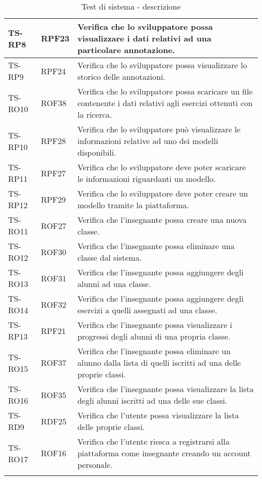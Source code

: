 \begin{longtable}{|>{\centering\arraybackslash}m{1.6cm}|>{\centering\arraybackslash}m{1.7cm}|m{6.41cm}|}
		\\ \hline 
		\rowcolor{white}
		TS-RP8		
		& RPF23 
		& Verifica che lo sviluppatore possa visualizzare i dati relativi ad una particolare annotazione. 		
		\\ \hline
		\rowcolor{LightGray}
		TS-RP9		
		& RPF24 
		& Verifica che lo sviluppatore possa visualizzare lo storico delle annotazioni. 
		\\ \hline
		\rowcolor{white}
		TS-RO10
		& ROF38 
		& Verifica che lo sviluppatore possa scaricare un file contenente i dati relativi agli esercizi ottenuti con la ricerca.
		\\ \hline
		\rowcolor{LightGray}
		TS-RP10		
		& RPF28 
		& Verifica che lo sviluppatore può visualizzare le informazioni relative ad uno dei modelli disponibili. 
		\\ \hline
		\rowcolor{white}
		TS-RP11		
		& RPF27 
		& Verifica che lo sviluppatore deve poter scaricare le informazioni riguardanti un modello. 
		\\ \hline
		\rowcolor{LightGray}
		TS-RP12		
		& RPF29 
		& Verifica che lo sviluppatore deve poter creare un modello tramite la piattaforma. 
		\\ \hline	
		
		\rowcolor{white}
		TS-RO11	
		& ROF27 
		& Verifica che l'insegnante possa creare una nuova classe. 
		\\ \hline
		\rowcolor{LightGray}
		TS-RO12	
		& ROF30 
		& Verifica che l'insegnante possa eliminare una classe dal sistema. 
		\\ \hline
		\rowcolor{white}
		TS-RO13
		& ROF31 
		& Verifica che l'insegnante possa aggiungere degli alunni ad una classe. 
		\\ \hline
		\rowcolor{LightGray}
		TS-RO14
		& ROF32 
		& Verifica che l'insegnante possa aggiungere degli esercizi a quelli assegnati ad una classe. 
		\\ \hline
		\rowcolor{white}
		TS-RP13
		& RPF21 
		& Verifica che l'insegnante possa visualizzare i progressi degli alunni di una propria classe.
		\\ \hline
		\rowcolor{LightGray}
		TS-RO15
		& ROF37 
		& Verifica che l'insegnante possa eliminare un alunno dalla lista di quelli iscritti ad una delle proprie classi. 
		\\ \hline
		\rowcolor{white}
		TS-RO16	
		& ROF35 
		& Verifica che l'insegnante possa visualizzare la lista degli alunni iscritti ad una delle sue classi. 
		\\ \hline
		\rowcolor{LightGray}
		TS-RD9
		& RDF25 
		& Verifica che l'utente possa visualizzare la lista delle proprie classi. 
		\\ \hline
		\rowcolor{LightGray}
		TS-RO17
		& ROF16
		& Verifica che l'utente riesca a registrarsi alla piattaforma come insegnante creando un account personale. 
		\\ \hline
		
		\caption{Test di sistema - descrizione}
\end{longtable}

